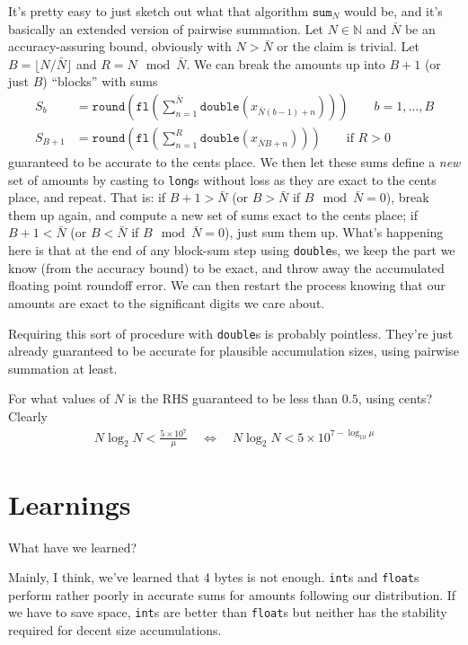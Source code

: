 \documentclass[11pt, oneside]{amsart}   	%
\begin{document}
It's pretty easy to just sketch out what that algorithm $\texttt{sum}_N$ would be, and it's basically an extended version of pairwise summation. Let $N \in \mathbb{N}$ and $\bar{N}$ be an accuracy-assuring bound, obviously with $N > \bar{N}$ or the claim is trivial. Let $B = \lfloor N/\bar{N} \rfloor$ and $R = N \mod \bar{N}$. We can break the amounts up into $B+1$ (or just $B$) ``blocks'' with sums
\begin{align*}
	S_b &= \texttt{round}\left( \texttt{fl}\left( \sum_{n=1}^{\bar{N}} \texttt{double}(x_{\bar{N}(b-1) + n}) \right) \right) \quad\quad b = 1,\dotsc,B \\
	S_{B+1} &= \texttt{round}\left( \texttt{fl}\left( \sum_{n=1}^{R} \texttt{double}(x_{\bar{N}B + n}) \right) \right) \quad\quad \text{if } R > 0
\end{align*}
guaranteed to be accurate to the cents place. We then let these sums define a {\em new} set of amounts by casting to \texttt{long}s without loss as they are exact to the cents place, and repeat. That is: if $B+1 > \bar{N}$ (or $B > \bar{N}$ if $B \mod \bar{N} = 0$), break them up again, and compute a new set of sums exact to the cents place; if $B+1 < \bar{N}$ (or $B < \bar{N}$ if $B \mod \bar{N} = 0$), just sum them up. What's happening here is that at the end of any block-sum step using \texttt{double}s, we keep the part we know (from the accuracy bound) to be exact, and throw away the accumulated floating point roundoff error. We can then restart the process knowing that our amounts are exact to the significant digits we care about. 

Requiring this sort of procedure with \texttt{double}s is probably pointless. They're just already guaranteed to be accurate for plausible accumulation sizes, using pairwise summation at least. 

For what values of $N$ is the RHS guaranteed to be less than $0.5$, using cents? Clearly
\begin{align*}
    N \log_2 N < \frac{ 5 \times 10^{7} }{\mu}
    \quad\iff\quad
    N \log_2 N < 5 \times 10^{7 - \log_{10}\mu}
\end{align*}

\section{Learnings}

What have we learned? 

Mainly, I think, we've learned that 4 bytes is not enough. \texttt{int}s and \texttt{float}s perform rather poorly in accurate sums for amounts following our distribution. If we have to save space, \texttt{int}s are better than \texttt{float}s but neither has the stability required for decent size accumulations. 
\end{document}
